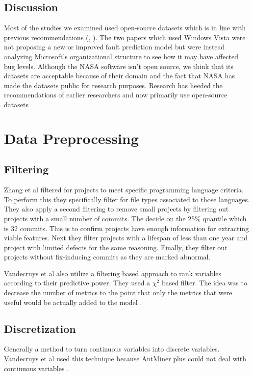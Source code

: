 \documentclass{sig-alternate-05-2015}
\begin{document}
\subsection{Discussion}
Most of the studies we examined used open-source datasets which is in line with previous recommendations (\cite{Catal}, \cite{Vandecruys}). The two papers which used Windows Vista were not proposing a new or improved fault prediction model but were instead analyzing Microsoft's organizational structure to see how it may have affected bug levels. Although the NASA software isn't open source, we think that its datasets are acceptable because of their domain and the fact that NASA has made the datasets public for research purposes. Research has heeded the recommendations of earlier researchers and now primarily use open-source datasets

\section{Data Preprocessing}
\subsection{Filtering}
Zhang et al \cite{Zhang2014} filtered for projects to meet specific programming language criteria. To perform this they specifically filter for file types associated to those languages. They also apply a second filtering to remove small projects by filtering out projects with a small number of commits. The decide on the 25\% quantile which is 32 commits. This is to confirm projects have enough information for extracting viable features. Next they filter projects with a lifespan of less than one year and project with limited defects for the same reasoning. Finally, they filter out projects without fix-inducing commits as they are marked abnormal. 

Vandecruys et al also utilize a filtering based approach to rank variables according to their predictive power.  They used a $\chi^{2}$ based filter.  The idea was to decrease the number of metrics to the point that only the metrics that were useful would be actually added to the model \cite{Vandecruys}.

\subsection{Discretization}
Generally a method to turn continuous variables into discrete variables.  Vandecruys et al used this technique because AntMiner plus could not deal with continuous variables \cite{Vandecruys}.    
\end{document}
